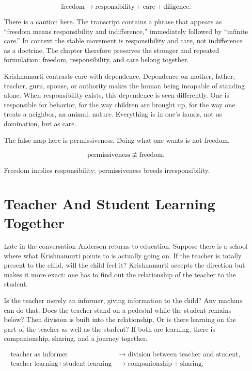 \begin{equation}
\text{freedom}
\longrightarrow
\text{responsibility}+\text{care}+\text{diligence}.
\end{equation}

There is a caution here. The transcript contains a phrase that appears as ``freedom means responsibility and indifference,'' immediately followed by ``infinite care.'' In context the stable movement is responsibility and care, not indifference as a doctrine. The chapter therefore preserves the stronger and repeated formulation: freedom, responsibility, and care belong together.

Krishnamurti contrasts care with dependence. Dependence on mother, father, teacher, guru, spouse, or authority makes the human being incapable of standing alone. When responsibility exists, this dependence is seen differently. One is responsible for behavior, for the way children are brought up, for the way one treats a neighbor, an animal, nature. Everything is in one's hands, not as domination, but as care.

The false map here is permissiveness. Doing what one wants is not freedom.

\begin{equation}
\text{permissiveness}
\not\equiv
\text{freedom}.
\end{equation}

Freedom implies responsibility; permissiveness breeds irresponsibility.

\section{Teacher And Student Learning Together}

Late in the conversation Anderson returns to education. Suppose there is a school where what Krishnamurti points to is actually going on. If the teacher is totally present to the child, will the child feel it? Krishnamurti accepts the direction but makes it more exact: one has to find out the relationship of the teacher to the student.

Is the teacher merely an informer, giving information to the child? Any machine can do that. Does the teacher stand on a pedestal while the student remains below? Then division is built into the relationship. Or is there learning on the part of the teacher as well as the student? If both are learning, there is companionship, sharing, and a journey together.

\begin{align}
\text{teacher as informer}
&\longrightarrow \text{division between teacher and student}, \\
\text{teacher learning}+\text{student learning}
&\longrightarrow \text{companionship}+\text{sharing}.
\end{align}

